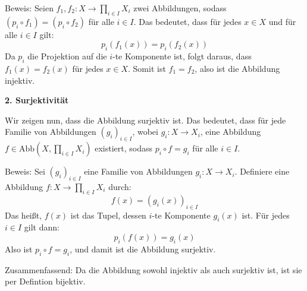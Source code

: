 \documentclass[11pt]{article}
\begin{document}
Beweis:
Seien \( f_1, f_2 : X \to \prod_{i \in I} X_i \) zwei Abbildungen, sodass \( (p_i \circ f_1) = (p_i \circ f_2) \) für alle \( i \in I \). Das bedeutet, dass für jedes \( x \in X \) und für alle \( i \in I \) gilt:
\[
p_i(f_1(x)) = p_i(f_2(x))
\]
Da \( p_i \) die Projektion auf die \( i \)-te Komponente ist, folgt daraus, dass \( f_1(x) = f_2(x) \) für jedes \( x \in X \). Somit ist \( f_1 = f_2 \), also ist die Abbildung injektiv.

\textbf{2. Surjektivität}

Wir zeigen nun, dass die Abbildung surjektiv ist. Das bedeutet, dass für jede Familie von Abbildungen \( (g_i)_{i \in I} \), wobei \( g_i : X \to X_i \), eine Abbildung \( f \in \text{Abb}(X, \prod_{i \in I} X_i) \) existiert, sodass \( p_i \circ f = g_i \) für alle \( i \in I \).

Beweis:
Sei \( (g_i)_{i \in I} \) eine Familie von Abbildungen \( g_i : X \to X_i \). Definiere eine Abbildung \( f : X \to \prod_{i \in I} X_i \) durch:
\[
f(x) = (g_i(x))_{i \in I}
\]
Das heißt, \( f(x) \) ist das Tupel, dessen \( i \)-te Komponente \( g_i(x) \) ist. Für jedes \( i \in I \) gilt dann:
\[
p_i(f(x)) = g_i(x)
\]
Also ist \( p_i \circ f = g_i \), und damit ist die Abbildung surjektiv.


Zusammenfassend:
Da die Abbildung sowohl injektiv als auch surjektiv ist, ist sie per Defintion bijektiv.




\end{document}
